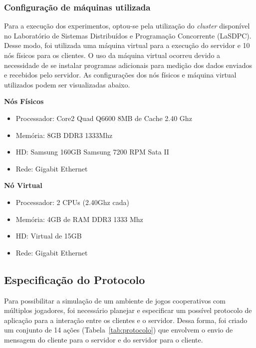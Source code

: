 \documentclass[12pt]{article}
\begin{document}
\subsubsection{Configuração de máquinas utilizada}

Para a execução dos experimentos, optou-se pela utilização do \textit{cluster}
disponível no Laboratório de Sistemas Distribuídos e Programação Concorrente
(LaSDPC). Desse modo, foi utilizada uma máquina virtual para a execução do
servidor e 10 nós físicos para os clientes. O uso da máquina virtual ocorreu
devido a necessidade de se instalar programas adicionais para medição dos dados
enviados e recebidos pelo servidor.  As configurações dos nós físicos e máquina
virtual utilizados podem ser visualizadas abaixo.

\textbf{Nós Físicos}

\begin{itemize}
  \item Processador: Core2 Quad Q6600 8MB de Cache 2.40 Ghz
  \item Memória: 8GB DDR3 1333Mhz
  \item HD: Samsung 160GB Samsung 7200 RPM Sata II
  \item Rede: Gigabit Ethernet 
\end{itemize}

\textbf{Nó Virtual}

\begin{itemize}
  \item Processador: 2 CPUs (2.40Ghz cada)
  \item Memória: 4GB de RAM DDR3 1333 Mhz
  \item HD: Virtual de 15GB
  \item Rede: Gigabit Ethernet
\end{itemize}

\subsection{Especificação do Protocolo} \label{sub:protocolo}

Para possibilitar a simulação de um ambiente de jogos cooperativos com
múltiplos jogadores, foi necessário planejar e especificar um possível
protocolo de aplicação para a interação entre os clientes e o servidor.  Dessa
forma, foi criado um conjunto de 14 ações (Tabela~\ref{tab:protocolo}) que
envolvem o envio de mensagem do cliente para o servidor e do servidor para o
cliente.
\end{document}
